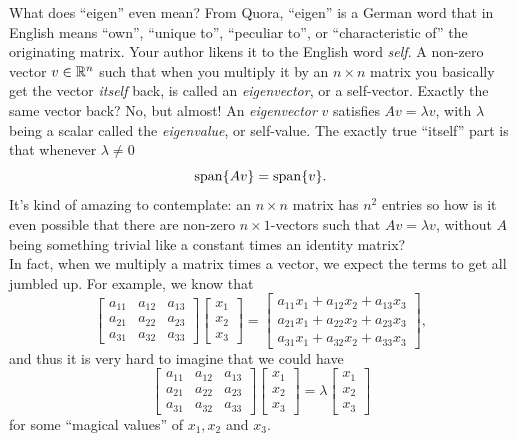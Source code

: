 What does ``eigen'' even mean? From Quora, ``eigen'' is a German word that in English means ``own'', ``unique to'', ``peculiar to'', or ``characteristic of'' the originating matrix. Your author likens it to the English word \textit{self}. A non-zero vector $v \in \mathbb R^n$ such that when you multiply it by an $n \times n$ matrix you basically get the vector \textit{itself} back, is called an \textit{eigenvector}, or a self-vector. Exactly the same vector back? No, but almost! An \textit{eigenvector} $v$ satisfies $A v = \lambda v$, with $\lambda$ being a scalar called the \textit{eigenvalue}, or self-value. The exactly true ``itself'' part is that whenever $\lambda \neq 0$
$$\mathrm{span} \{ A v \} = \mathrm{span} \{ v \}.$$
It's kind of amazing to contemplate: an $n \times n$ matrix has $n^2$ entries so how is it even possible that there are non-zero $n \times 1$-vectors such that $A v = \lambda v$, without $A$ being something trivial like a constant times an identity matrix? \\


In fact, when we multiply a matrix times a vector, we expect the terms to get all jumbled up. For example, we know that
$$\left[\begin{array}{rrc}  a_{11} & a_{12} & a_{13} \\  a_{21} & a_{22} & a_{23}  \\ a_{31} & a_{32} & a_{33} \end{array} \right] \left[\begin{array}{r}  x_1 \\ x_2 \\ x_3\end{array} \right] = \left[\begin{array}{r}  a_{11} x_1 + a_{12} x_2 + a_{13} x_3 \\  a_{21} x_1 + a_{22} x_2 + a_{23} x_3 \\  a_{31} x_1 + a_{32} x_2 + a_{33} x_3\end{array} \right],$$
and thus it is very hard to imagine that we could have 
$$\left[\begin{array}{rrc}  a_{11} & a_{12} & a_{13} \\  a_{21} & a_{22} & a_{23}  \\ a_{31} & a_{32} & a_{33} \end{array} \right] \left[\begin{array}{r}  x_1 \\ x_2 \\ x_3\end{array} \right] = \lambda \left[\begin{array}{r}  x_1 \\ x_2 \\ x_3\end{array} \right]$$
for some ``magical values'' of $x_1, x_2$ and $x_3$. 



